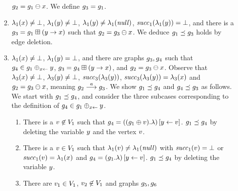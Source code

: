 \begin{enumerate}
\begin{enumerate}
$g_2=g_1\ominus{\ensuremath{x}}$.
%
We define $g_3=g_1$.
%
\item
\label{assignmentnext:defined:defined:undefined}
$\lambda_1(x)\neq\bot$,
$\lambda_1(y)\neq\bot$, 
$\lambda_1(y)\neq\lambda_1({\it null})$, 
${\it succ}_1(\lambda_1(y))=\bot$,
and there is a $g_3=g_1\boxplus({y}\rightarrow{\ensuremath{x}})$
such that
$g_2=g_3\ominus{\ensuremath{x}}$.
%
%
%
%
We deduce $g_1\preceq g_3$ holds by edge deletion.
%
\item
\label{assignmentnext:defined:undefined}
$\lambda_1(x)\neq\bot$,
$\lambda_1(y)=\bot$,
and there are graphs $g_3,g_4$ such that
$g_4\in g_1\oplus_{{x}\leftarrow}{y}$,
$g_3=g_4\boxplus({y}\rightarrow{\ensuremath{x}})$, and
$g_2=g_3\ominus{\ensuremath{x}}$.
%
Observe that 
$\lambda_3(x)\neq\bot$,
$\lambda_3(y)\neq\bot$,
${\it succ}_3(\lambda_3(y))$,
${\it succ}_3(\lambda_3(y))=\lambda_3(x)$ and 
$g_2=g_3\ominus{\ensuremath{x}}$,
meaning $g_2\stackrel{a}{\longrightarrow}g_3$.
%
We show $g_1\preceq g_4$
and $g_4\preceq g_3$ as follows.
%
We start with $g_1\preceq g_4$, and consider the 
three subcases corresponding to the definition 
of $g_4\in g_1\oplus_{{x}\leftarrow}{y}$.
\begin{enumerate}
\item 
\label{assignmentnext:defined:undefined:vertex}
There is a $v\not\in V_1$ such that
$g_4=\left((g_1\oplus{\ensuremath{v}}).\lambda\right)\left[y\leftarrow v\right]$.
%
$g_1\preceq g_4$ by deleting the variable $y$ and the vertex $v$.
%
\item
\label{assignmentnext:defined:undefined:variable}
There is a $v\in V_1$ such that 
$\lambda_1(v)\neq\lambda_1({\it null})$
with ${\it succ}_1(v)=\bot$ or ${\it succ}_1(v)=\lambda_1(x)$ 
and $g_4=\left(g_1.\lambda\right)\left[y\leftarrow v\right]$.
%
$g_1\preceq g_4$ by deleting the variable $y$.
%
\item
\label{assignmentnext:defined:undefined:contraction}
There are $v_1\in V_1$, 
$v_2\not\in V_1$ and graphs $g_5, g_6$

\end{enumerate}
\end{enumerate}
\end{enumerate}
